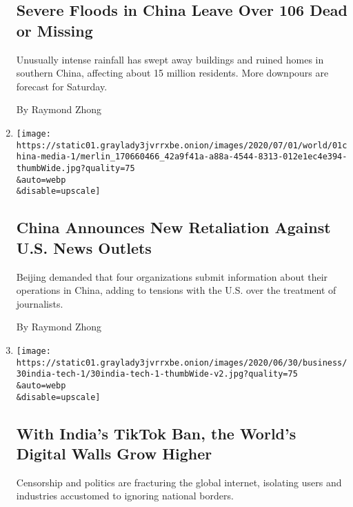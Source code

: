 \begin{enumerate}
  \hypertarget{severe-floods-in-china-leave-over-106-dead-or-missing}{%
  \subsection{Severe Floods in China Leave Over 106 Dead or
  Missing}\label{severe-floods-in-china-leave-over-106-dead-or-missing}}

  Unusually intense rainfall has swept away buildings and ruined homes
  in southern China, affecting about 15 million residents. More
  downpours are forecast for Saturday.

  By Raymond Zhong
\item
  \href{/2020/07/01/business/media/china-journalists-crackdown.html}{}

  \texttt{[image: https://static01.graylady3jvrrxbe.onion/images/2020/07/01/world/01china-media-1/merlin\_170660466\_42a9f41a-a88a-4544-8313-012e1ec4e394-thumbWide.jpg?quality=75\\\&auto=webp\\\&disable=upscale]}

  \hypertarget{china-announces-new-retaliation-against-us-news-outlets}{%
  \subsection{China Announces New Retaliation Against U.S. News
  Outlets}\label{china-announces-new-retaliation-against-us-news-outlets}}

  Beijing demanded that four organizations submit information about
  their operations in China, adding to tensions with the U.S. over the
  treatment of journalists.

  By Raymond Zhong
\item
  \href{/2020/06/30/technology/india-china-tiktok.html}{}

  \texttt{[image: https://static01.graylady3jvrrxbe.onion/images/2020/06/30/business/30india-tech-1/30india-tech-1-thumbWide-v2.jpg?quality=75\\\&auto=webp\\\&disable=upscale]}

  \hypertarget{with-indias-tiktok-ban-the-worlds-digital-walls-grow-higher}{%
  \subsection{With India's TikTok Ban, the World's Digital Walls Grow
  Higher}\label{with-indias-tiktok-ban-the-worlds-digital-walls-grow-higher}}

  Censorship and politics are fracturing the global internet, isolating
  users and industries accustomed to ignoring national borders.


\end{enumerate}
